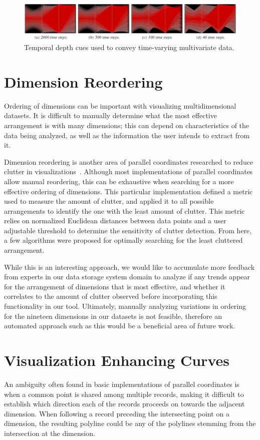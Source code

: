\documentclass[12pt]{ucthesis}
\begin{document}
\begin{figure}[h!]
 \centering
 \includegraphics[width=\textwidth]{images/temporal_depth.jpg}
 \caption{Temporal depth cues used to convey time-varying multivariate data.}
 \label{fig:temporal_depth}
\end{figure}

\section{Dimension Reordering}
\label{dimensional_reordering}
Ordering of dimensions can be important with visualizing multidimensional datasets. It is difficult to manually determine what the most effective arrangement is with many dimensions; this can depend on characteristics of the data being analyzed, as well as the information the user intends to extract from it.

Dimension reordering is another area of parallel coordinates researched to reduce clutter in visualizations~\cite{peng:2005:CRMD}. Although most implementations of parallel coordinates allow manual reordering, this can be exhaustive when searching for a more effective ordering of dimensions. This particular implementation defined a metric used to measure the amount of clutter, and applied it to all possible arrangements to identify the one with the least amount of clutter. This metric relies on normalized Euclidean distances between data points and a user adjustable threshold to determine the sensitivity of clutter detection. From here, a few algorithms were proposed for optimally searching for the least cluttered arrangement. 

While this is an interesting approach, we would like to accumulate more feedback from experts in our data storage system domain to analyze if any trends appear for the arrangement of dimensions that is most effective, and whether it correlates to the amount of clutter observed before incorporating this functionality in our tool. Ultimately, manually analyzing variations in ordering for the nineteen dimensions in our datasets is not feasible, therefore an automated approach such as this would be a beneficial area of future work.

\section{Visualization Enhancing Curves}
\label{curves}
An ambiguity often found in basic implementations of parallel coordinates is when a common point is shared among multiple records, making it difficult to establish which direction each of the records proceeds on towards the adjacent dimension. When following a record preceding the intersecting point on a dimension, the resulting polyline could be any of the polylines stemming from the intersection at the dimension.
\end{document}
